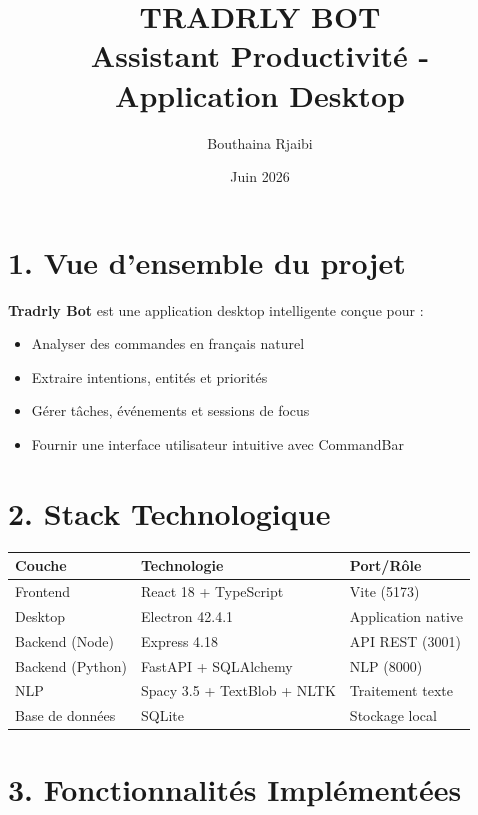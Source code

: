 \documentclass[12pt,french]{article}
\title{\textbf{\Large TRADRLY BOT}\\{\small Assistant Productivité - Application Desktop}}
\author{Bouthaina Rjaibi}
\date{Juin 2026}
\begin{document}
\maketitle

\section*{1. Vue d'ensemble du projet}

\textbf{Tradrly Bot} est une application desktop intelligente conçue pour :
\begin{itemize}
    \item Analyser des commandes en français naturel
    \item Extraire intentions, entités et priorités
    \item Gérer tâches, événements et sessions de focus
    \item Fournir une interface utilisateur intuitive avec CommandBar
\end{itemize}

\vspace{0.5cm}

\section*{2. Stack Technologique}

\begin{table}[h!]
\centering
\begin{tabular}{lll}
\toprule
\textbf{Couche} & \textbf{Technologie} & \textbf{Port/Rôle} \\
\midrule
Frontend & React 18 + TypeScript & Vite (5173) \\
Desktop & Electron 42.4.1 & Application native \\
Backend (Node) & Express 4.18 & API REST (3001) \\
Backend (Python) & FastAPI + SQLAlchemy & NLP (8000) \\
NLP & Spacy 3.5 + TextBlob + NLTK & Traitement texte \\
Base de données & SQLite & Stockage local \\
\bottomrule
\end{tabular}
\end{table}

\vspace{0.5cm}

\section*{3. Fonctionnalités Implémentées}
\end{document}
